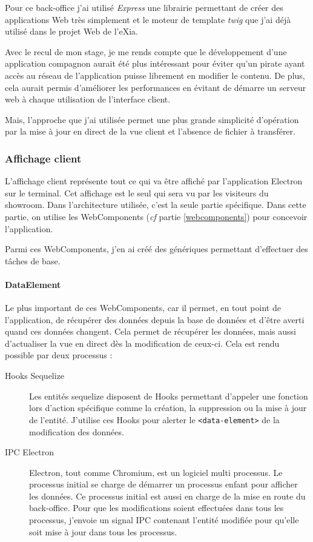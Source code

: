 Pour ce back-office j'ai utilisé \emph{Express} une librairie permettant de créer des applications Web très simplement et le moteur de template \emph{twig} que j'ai déjà utilisé dans le projet Web de l'eXia.

\bigskip

Avec le recul de mon stage, je me rends compte que le développement d'une application compagnon aurait été plus intéressant pour éviter qu'un pirate ayant accès au réseau de l'application puisse librement en modifier le contenu.
De plus, cela aurait permis d'améliorer les performances en évitant de démarre un serveur web à chaque utilisation de l'interface client.

Mais, l'approche que j'ai utilisée permet une plus grande simplicité d'opération par la mise à jour en direct de la vue client et l'absence de fichier à transférer.

\subsubsection{Affichage client}

 L'affichage client représente tout ce qui va être affiché par l'application Electron sur le terminal.
Cet affichage est le seul qui sera vu par les visiteurs du showroom.
Dans l'architecture utilisée, c'est la seule partie spécifique.
Dans cette partie, on utilise les WebComponents (\emph{cf} partie \ref{webcomponents}) pour concevoir l'application.

Parmi ces WebComponents, j'en ai créé des génériques permettant d'effectuer des tâches de base.


\paragraph{DataElement} Le plus important de ces WebComponents, car il permet, en tout point de l'application, de récupérer des données depuis la base de données et d'être averti quand ces données changent.
Cela permet de récupérer les données, mais aussi d'actualiser la vue en direct dès la modification de ceux-ci.
Cela est rendu possible par deux processus :
\begin{description}
    \item[Hooks Sequelize] Les entités sequelize disposent de Hooks permettant d'appeler une fonction lors d'action spécifique comme la création, la suppression ou la mise à jour de l'entité. J'utilise ces Hooks pour alerter le \texttt{<data-element>} de la modification des données.
    \item[IPC Electron] Electron, tout comme Chromium, est un logiciel multi processus. Le processus initial se charge de démarrer un processus enfant pour afficher les données. Ce processus initial est aussi en charge de la mise en route du back-office. Pour que les modifications soient effectuées dans tous les processus, j'envoie un signal IPC contenant l'entité modifiée pour qu'elle soit mise à jour dans tous les processus.
\end{description}

